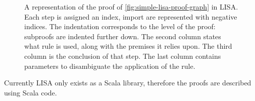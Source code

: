 \begin{figure}[H]
  \centering
  
  \caption[Proof in LISA]{A representation of the proof of \autoref{fig:simple-lisa-proof-graph} in LISA. Each step is assigned an index, import are represented with negative indices. The indentation corresponds to the level of the proof: subproofs are indented further down. The second column states what rule is used, along with the premises it relies upon. The third column is the conclusion of that step. The last column contains parameters to disambiguate the application of the rule.}
  \label{fig:simple-lisa-proof}
\end{figure}

Currently LISA only exists as a Scala library, therefore the proofs are described using Scala code.
